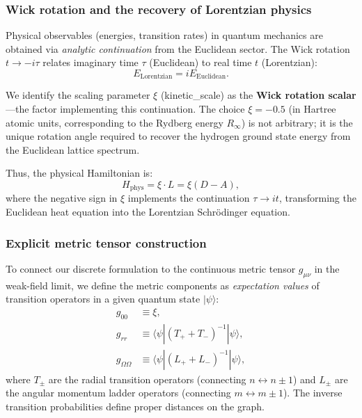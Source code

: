 \documentclass[aps,prd,twocolumn,superscriptaddress,groupedaddress,showpacs]{revtex4-2}
\begin{document}
\subsubsection{Wick rotation and the recovery of Lorentzian physics}

Physical observables (energies, transition rates) in quantum mechanics are obtained via \emph{analytic continuation} from the Euclidean sector. The Wick rotation $t \to -i\tau$ relates imaginary time $\tau$ (Euclidean) to real time $t$ (Lorentzian):
\begin{equation}
E_{\text{Lorentzian}} = i E_{\text{Euclidean}}.
\end{equation}

We identify the scaling parameter $\xi$ (kinetic\_scale) as the \textbf{Wick rotation scalar}---the factor implementing this continuation. The choice $\xi = -0.5$ (in Hartree atomic units, corresponding to the Rydberg energy $R_\infty$) is not arbitrary; it is the unique rotation angle required to recover the hydrogen ground state energy from the Euclidean lattice spectrum.

Thus, the physical Hamiltonian is:
\begin{equation}
H_{\text{phys}} = \xi \cdot L = \xi (D - A),
\end{equation}
where the negative sign in $\xi$ implements the continuation $\tau \to it$, transforming the Euclidean heat equation into the Lorentzian Schr\"odinger equation.

\subsubsection{Explicit metric tensor construction}

To connect our discrete formulation to the continuous metric tensor $g_{\mu\nu}$ in the weak-field limit, we define the metric components as \emph{expectation values} of transition operators in a given quantum state $|\psi\rangle$:
\begin{align}
g_{00} &\equiv \xi, \label{eq:g00} \\
g_{rr} &\equiv \langle \psi | (T_+ + T_-)^{-1} | \psi \rangle, \label{eq:grr} \\
g_{\Omega\Omega} &\equiv \langle \psi | (L_+ + L_-)^{-1} | \psi \rangle, \label{eq:gOmega}
\end{align}
where $T_\pm$ are the radial transition operators (connecting $n \leftrightarrow n \pm 1$) and $L_\pm$ are the angular momentum ladder operators (connecting $m \leftrightarrow m \pm 1$). The inverse transition probabilities define proper distances on the graph.
\end{document}
